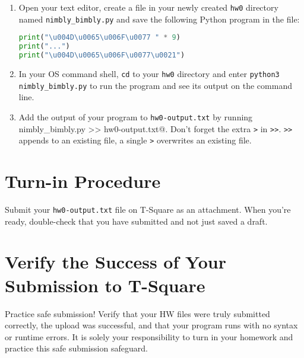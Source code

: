 \documentclass[12pt]{article}
\begin{document}
\begin{enumerate}
\item Open your text editor, create a file in your newly created {\tt hw0} directory named {\tt nimbly\_bimbly.py} and save the following Python program in the file:
\begin{lstlisting}[language=Python]
print("\u004D\u0065\u006F\u0077 " * 9)
print("...")
print("\u004D\u0065\u006F\u0077\u0021")
\end{lstlisting}
\item In your OS command shell, {\tt cd} to your {\tt hw0} directory and enter {\tt python3 nimbly\_bimbly.py} to run the program and see its output on the command line.
\item Add the output of your program to {\tt hw0-output.txt} by running\\
   nimbly_bimbly.py >> hw0-output.txt@. Don't forget the extra {\tt >} in {\tt >>}. {\tt >>} appends to an existing file, a single {\tt >} overwrites an existing file.
\end{enumerate}

\section{Turn-in Procedure}

Submit your {\tt hw0-output.txt} file on T-Square as an attachment.  When you're ready, double-check that you have submitted and not just saved a draft.

\section{Verify the Success of Your Submission to T-Square}

Practice safe submission! Verify that your HW files were truly submitted correctly, the upload was successful, and that your program runs with no syntax or runtime errors. It is solely your responsibility to turn in your homework and practice this safe submission safeguard.
\end{document}
